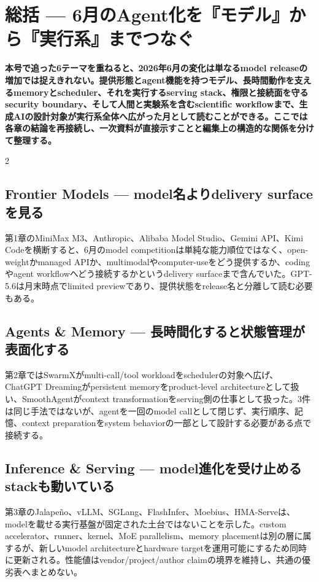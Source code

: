 \section{総括 — 6月のAgent化を『モデル』から『実行系』までつなぐ}
\label{sec:retrospective-synthesis}
\noindent\textbf{本号で追った6テーマを重ねると、2026年6月の変化は単なるmodel releaseの増加では捉えきれない。提供形態とagent機能を持つモデル、長時間動作を支えるmemoryとscheduler、それを実行するserving stack、権限と接続面を守るsecurity boundary、そして人間と実験系を含むscientific workflowまで、生成AIの設計対象が実行系全体へ広がった月として読むことができる。ここでは各章の結論を再接続し、一次資料が直接示すことと編集上の構造的な関係を分けて整理する。}
\medskip
\begin{multicols}{2}
\par\medskip
\subsection{Frontier Models — model名よりdelivery surfaceを見る}
第1章のMiniMax M3、Anthropic、Alibaba Model Studio、Gemini API、Kimi Codeを横断すると、6月のmodel competitionは単純な能力順位ではなく、open-weightかmanaged APIか、multimodalやcomputer-useをどう提供するか、codingやagent workflowへどう接続するかというdelivery surfaceまで含んでいた。GPT-5.6は月末時点でlimited previewであり、提供状態をrelease名と分離して読む必要もある。 \cite{src-d8e13386974c,src-f6aa679babd7,src-a24fd97eb3d0,src-9191d43918fc,src-30f48121decc}

\par\medskip
\subsection{Agents \& Memory — 長時間化すると状態管理が表面化する}
第2章ではSwarmXがmulti-call/tool workloadをschedulerの対象へ広げ、ChatGPT Dreamingがpersistent memoryをproduct-level architectureとして扱い、SmoothAgentがcontext transformationをserving側の仕事として扱った。3件は同じ手法ではないが、agentを一回のmodel callとして閉じず、実行順序、記憶、context preparationをsystem behaviorの一部として設計する必要がある点で接続する。 \cite{src-e8d9fd84bddc,src-c3ab33c62226,src-80f8b4d899ff}

\par\medskip
\subsection{Inference \& Serving — model進化を受け止めるstackも動いている}
第3章のJalapeño、vLLM、SGLang、FlashInfer、Moebius、HMA-Serveは、modelを載せる実行基盤が固定された土台ではないことを示した。custom accelerator、runner、kernel、MoE parallelism、memory placementは別の層に属するが、新しいmodel architectureとhardware targetを運用可能にするため同時に更新される。性能値はvendor/project/author claimの境界を維持し、共通の優劣表へまとめない。 \cite{src-855db08b75f6,src-6cc910fb0183,src-538cecdad845,src-272a6dac5bcc,src-43606e2afafd,src-a66d76643eee}


\end{multicols}
